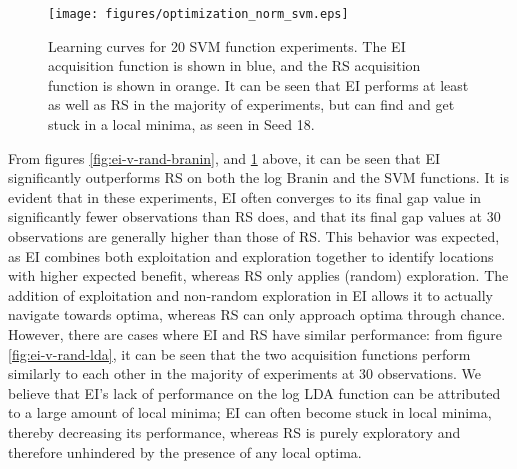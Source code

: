 \documentclass[11pt]{article}
\numberwithin{equation}{section}
\begin{document}
\begin{figure}[H]
  \centering
  \texttt{[image: figures/optimization\_norm\_svm.eps]}
  \caption{Learning curves for 20 SVM function experiments. The EI acquisition function is shown in blue, and the RS acquisition function is shown in orange. It can be seen that EI performs at least as well as RS in the majority of experiments, but can find and get stuck in a local minima, as seen in Seed 18.}
  \label{fig:ei-v-rand-svm}
\end{figure}
From figures \ref{fig:ei-v-rand-branin}, and \ref{fig:ei-v-rand-svm} above, it can be seen that EI significantly outperforms RS on both the log Branin and the SVM functions.
It is evident that in these experiments, EI often converges to its final gap value in significantly fewer observations than RS does, and that its final gap values at 30 observations are generally higher than those of RS. This behavior was expected, as EI combines both exploitation and exploration together to identify locations with higher expected benefit, whereas RS only applies (random) exploration. The addition of exploitation and non-random exploration in EI allows it to actually navigate towards optima, whereas RS can only approach optima through chance. 
However, there are cases where EI and RS have similar performance: from figure \ref{fig:ei-v-rand-lda}, it can be seen that the two acquisition functions perform similarly to each other in the majority of experiments at 30 observations. 
We believe that EI's lack of performance on the log LDA function can be attributed to a large amount of local minima; EI can often become stuck in local minima, thereby decreasing its performance, whereas RS is purely exploratory and therefore unhindered by the presence of any local optima.
\end{document}
